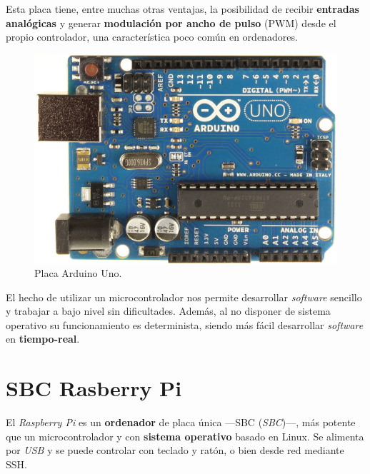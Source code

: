 \smallskip

Esta placa tiene, entre muchas otras ventajas, la posibilidad de recibir \textbf{entradas analógicas} y generar \textbf{modulación por ancho de pulso} (\acrshort{PWM}) desde el propio controlador, una característica poco común en ordenadores.

\smallskip

\begin{figure}[H]
	\noindent \begin{centering}
		\includegraphics[width=\linewidth/2]{capitulo3/arduino}
		\par\end{centering}
	\smallskip
	\caption{\label{fig:arduino} Placa Arduino Uno.}
\end{figure} 

\smallskip

El hecho de utilizar un microcontrolador nos permite desarrollar \textit{software} sencillo y trabajar a bajo nivel sin dificultades. Además, al no disponer de sistema operativo su funcionamiento es determinista, siendo más fácil desarrollar \textit{software} en \textbf{tiempo-real}.

\newpage

\section{SBC Rasberry Pi}

El \textit{Raspberry Pi} es un \textbf{ordenador} de placa única ---\acrshort{SBC} (\textit{\acrlong{SBC}})---, más potente que un microcontrolador y con \textbf{sistema operativo} basado en Linux. Se alimenta por \textit{USB} y se puede controlar con teclado y ratón, o bien desde red mediante \acrshort{SSH}. 


